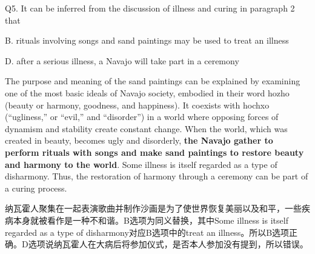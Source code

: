 \begin{blk}
    \begin{qst}
        Q5. It can be inferred from the discussion of illness and curing in paragraph 2 that
    \end{qst}

    \begin{chc}
        B. rituals involving songs and sand paintings may be used to treat an illness

        D. after a serious illness, a Navajo will take part in a ceremony
    \end{chc}

    \begin{psgq}
        The purpose and meaning of the sand paintings can be explained by examining one of the most basic ideals of Navajo society, embodied in their word hozho (beauty or harmony, goodness, and happiness). It coexists with hochxo (“ugliness,” or “evil,” and “disorder”) in a world where opposing forces of dynamism and stability create constant change. When the world, which was created in beauty, becomes ugly and disorderly, \textbf{the Navajo gather to perform rituals with songs and make sand paintings to restore beauty and harmony to the world}. Some illness is itself regarded as a type of disharmony. Thus, the restoration of harmony through a ceremony can be part of a curing process.
    \end{psgq}

    \begin{nlz}
        纳瓦霍人聚集在一起表演歌曲并制作沙画是为了使世界恢复美丽以及和平，一些疾病本身就被看作是一种不和谐。B选项为同义替换，其中Some illness is itself regarded as a type of disharmony对应B选项中的treat an illness。所以B选项正确。D选项说纳瓦霍人在大病后将参加仪式，是否本人参加没有提到，所以错误。
    \end{nlz}
\end{blk}

